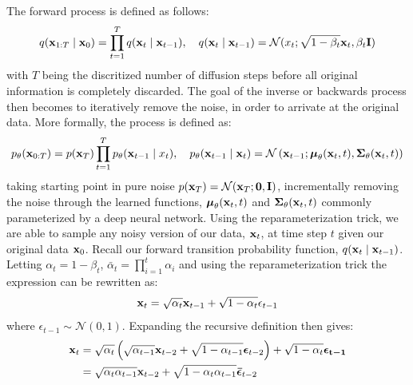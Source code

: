 The forward process is defined as follows:
\begin{equation}    
    q(\boldsymbol{\mathbf{x}}_{1:T} \mid \boldsymbol{\mathbf{x}}_{0}) = \prod_{t=1}^T q(\boldsymbol{\mathbf{x}}_{t} \mid \boldsymbol{\mathbf{x}}_{t-1}), \quad q(\boldsymbol{\mathbf{x}}_{t} \mid \boldsymbol{\mathbf{x}}_{t-1}) = \mathcal{N}(x_{t}; \sqrt{1 - \beta_t}\boldsymbol{\mathbf{x}}_t,\beta_t \boldsymbol{\mathbf{I}} )
\end{equation}
with $T$ being the discritized number of diffusion steps before all original information is completely discarded. The goal of the inverse or backwards process then becomes to iteratively remove the noise, in order to arrivate at the original data. More formally, the process is defined as:
\begin{equation}
    p_\theta(\boldsymbol{\mathbf{x}}_{0:T}) = p(\boldsymbol{\mathbf{x}}_T) \prod_{t=1}^T p_\theta(\boldsymbol{\mathbf{x}}_{t-1} \mid x_{t}), \quad p_\theta(\boldsymbol{\mathbf{x}}_{t-1} \mid \boldsymbol{\mathbf{x}}_{t}) = \mathcal{N}\left(\boldsymbol{\mathbf{x}}_{t-1}; \boldsymbol{\mathbf{\mu}}_\theta(\boldsymbol{\mathbf{x}}_t, t), \boldsymbol{\mathbf{\Sigma}}_\theta(\boldsymbol{\mathbf{x}}_t, t) \right)
\end{equation}
taking starting point in pure noise $p(\boldsymbol{\mathbf{x}}_T) = \mathcal{N}(\boldsymbol{\mathbf{x}}_T; \boldsymbol{\mathbf{0}}, \boldsymbol{\mathbf{I}})$, incrementally removing the noise through the learned functions, $\boldsymbol{\mathbf{\mu}}_\theta(\boldsymbol{\mathbf{x}}_t, t)$ and $\boldsymbol{\mathbf{\Sigma}}_\theta(\boldsymbol{\mathbf{x}}_t, t)$ commonly parameterized by a deep neural network.
Using the reparameterization trick, we are able to sample any noisy version of our data, $\boldsymbol{\mathbf{x}}_t$, at time step $t$ given our original data $\boldsymbol{\mathbf{x}}_0$. Recall our forward transition probability function, $q(\boldsymbol{\mathbf{x}}_t \mid \boldsymbol{\mathbf{x}}_{t-1})$. Letting $\alpha_t = 1 - \beta_t$, $\bar{\alpha}_t = \prod_{i=1}^t \alpha_i$ and using the reparameterization trick the expression can be rewritten as:
\begin{equation}
    \boldsymbol{\mathbf{x}}_t = \sqrt{\alpha_t} \boldsymbol{\mathbf{x}}_{t-1} + \sqrt{1 - \alpha_t} \epsilon_{t-1}
\end{equation}
where $\epsilon_{t-1} \sim \mathcal{N}(0,1)$. Expanding the recursive definition then gives:
\begin{align*}
    \vect{x}_t    %
                    & = \sqrt{\alpha_t} \left( \sqrt{\alpha_{t-1}} \vect{x}_{t-2} + \sqrt{1 - \alpha_{t-1}} \vect{\epsilon}_{t-2} \right) + \sqrt{1 - \alpha_t} \vect{\epsilon_{t-1}} \\
                    & = \sqrt{\alpha_t \alpha_{t-1}} \vect{x}_{t-2} + \sqrt{1 - \alpha_{t}\alpha_{t-1}} \vect{\bar{\epsilon}}_{t-2}
\end{align*}
